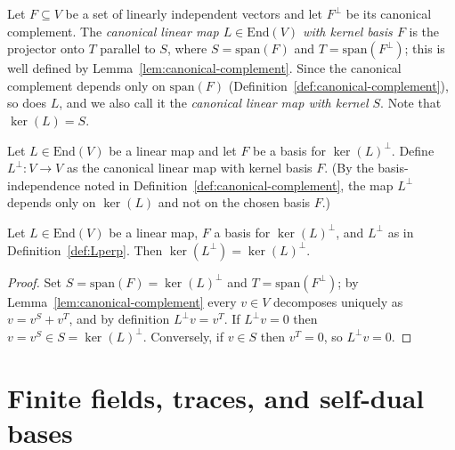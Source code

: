 \begin{definition}\label{def:cl-canonical}
	Let $F \subseteq V$ be a set of linearly independent vectors and let
	$F^\perp$ be its canonical complement. The \emph{canonical linear map
	$L \in \mathrm{End}(V)$ with kernel basis $F$} is the projector onto $T$
	parallel to $S$, where $S = \mathrm{span}(F)$ and
	$T = \mathrm{span}(F^\perp)$; this is well defined by
	Lemma~\ref{lem:canonical-complement}. Since the canonical complement
	depends only on $\mathrm{span}(F)$
	(Definition~\ref{def:canonical-complement}), so does $L$, and we also call
	it the \emph{canonical linear map with kernel $S$}. Note that
	$\ker(L) = S$.
\end{definition}

\begin{definition}\label{def:Lperp}
	\leanok
	Let $L \in \mathrm{End}(V)$ be a linear map and let $F$ be a basis for
	$\ker(L)^\perp$. Define $L^\perp : V \to V$ as the canonical linear map with
	kernel basis $F$. (By the basis-independence noted in
	Definition~\ref{def:canonical-complement}, the map $L^\perp$ depends only
	on $\ker(L)$ and not on the chosen basis $F$.)
\end{definition}

\begin{lemma}\label{lem:L_perp_perp}
	\leanok
	Let $L \in \mathrm{End}(V)$ be a linear map, $F$ a basis for
	$\ker(L)^\perp$, and $L^\perp$ as in Definition~\ref{def:Lperp}. Then
	$\ker(L^\perp) = \ker(L)^\perp$.
\end{lemma}
\begin{proof}
	\leanok
	Set $S = \mathrm{span}(F) = \ker(L)^\perp$ and $T = \mathrm{span}(F^\perp)$;
	by Lemma~\ref{lem:canonical-complement} every $v \in V$ decomposes uniquely
	as $v = v^S + v^T$, and by definition $L^\perp v = v^T$. If
	$L^\perp v = 0$ then $v = v^S \in S = \ker(L)^\perp$. Conversely, if
	$v \in S$ then $v^T = 0$, so $L^\perp v = 0$.
\end{proof}

\section{Finite fields, traces, and self-dual bases}
\label{sec:finite-fields}
\label{sec:subfields}
\label{sec:ff-representations}

